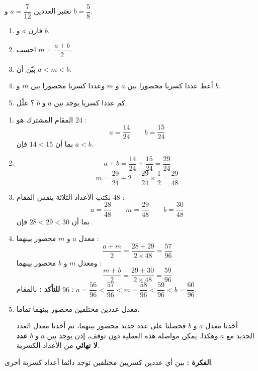 \documentclass[12pt,a4paper]{article}
\begin{document}
\begin{corr}[title={تركيب: معدل عددين كسريين}, stars=3, source={Axiomaths}]
نعتبر العددين $a=\dfrac{7}{12}$ و $b=\dfrac{5}{8}$.
\begin{enumerate}
  \item قارن $a$ و $b$.
  \item احسب $m=\dfrac{a+b}{2}$.
  \item بيّن أن $a<m<b$.
  \item أعط عددا كسريا محصورا بين $a$ و $m$ وعددا كسريا محصورا بين $m$ و $b$.
  \item كم عددا كسريا يوجد بين $a$ و $b$ ؟ علّل.
\end{enumerate}
\axsol
\begin{enumerate}[itemsep=14pt]
  \item المقام المشترك هو $24$ :
  \[a=\dfrac{14}{24}\qquad b=\dfrac{15}{24}\]
  بما أن $14<15$ فإن $a<b$.
  \item
  \[a+b=\dfrac{14}{24}+\dfrac{15}{24}=\dfrac{29}{24}\]
  \[m=\dfrac{29}{24}\div2=\dfrac{29}{24}\times\dfrac{1}{2}=\dfrac{29}{48}\]
  \item نكتب الأعداد الثلاثة بنفس المقام $48$ :
  \[a=\dfrac{28}{48}\qquad m=\dfrac{29}{48}\qquad b=\dfrac{30}{48}\]
  بما أن $28<29<30$ فإن .
  \item معدل $a$ و $m$ محصور بينهما :
  \[\dfrac{a+m}{2}=\dfrac{28+29}{2\times48}=\dfrac{57}{96}\]
  ومعدل $m$ و $b$ محصور بينهما :
  \[\dfrac{m+b}{2}=\dfrac{29+30}{2\times48}=\dfrac{59}{96}\]
  \textbf{للتأكد :} بالمقام $96$ : $a=\dfrac{56}{96}<\dfrac{57}{96}<m=\dfrac{58}{96}<\dfrac{59}{96}<b=\dfrac{60}{96}$.
  \item\leavevmode
  \begin{prop}[خاصية]
  معدل عددين مختلفين محصور بينهما تماما.
  \end{prop}
  أخذنا معدل $a$ و $b$ فحصلنا على عدد جديد محصور بينهما، ثم أخذنا معدل العدد الجديد مع $a$ وهكذا.
  يمكن مواصلة هذه العملية دون توقف، إذن يوجد بين $a$ و $b$ \textbf{عدد لا نهائي} من الأعداد الكسرية.
\end{enumerate}
\textbf{الفكرة :} بين أي عددين كسريين مختلفين توجد دائما أعداد كسرية أخرى.
\end{corr}
\end{document}
